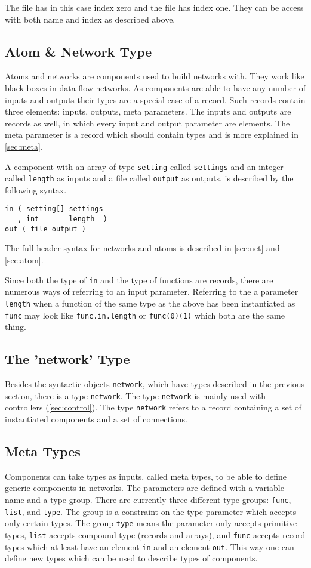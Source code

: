 The file has in this case index zero and the file has index one. They
can be access with both name and index as described above.

\subsection{Atom \& Network Type}\label{sec:atomnet}
Atoms and networks are components used to build networks with. They
work like black boxes in data-flow networks. As components are able to
have any number of inputs and outputs their types are a special case
of a record. Such records contain three elements: inputs, outputs,
meta parameters. The inputs and outputs are records as well, in which
every input and output parameter are elements. The meta parameter is a
record which should contain types and is more explained in
\autoref{sec:meta}.

A component with an array of type \verb#setting# called
\verb#settings# and an integer called \verb#length# as inputs and a
file called \verb#output# as outputs, is described by the following
syntax.

\begin{verbatim}
in ( setting[] settings
   , int       length  )
out ( file output )
\end{verbatim}

The full header syntax for networks and atoms is described in
\autoref{sec:net} and \autoref{sec:atom}.

Since both the type of \verb#in# and the type of functions are
records, there are numerous ways of referring to an input
parameter. Referring to the a parameter \verb#length# when a function
of the same type as the above has been instantiated as \verb#func# may
look like \verb#func.in.length# or \verb#func(0)(1)# which both are
the same thing.

\subsection{The 'network' Type}
Besides the syntactic objects \verb#network#, which have types
described in the previous section, there is a type \verb#network#. The
type \verb#network# is mainly used with controllers
(\autoref{sec:control}). The type \verb#network# refers to a record
containing a set of instantiated components and a set of connections.

\subsection{Meta Types}\label{sec:meta}
Components can take types as inputs, called meta types, to be able to
define generic components in networks. The parameters are defined with
a variable name and a type group. There are currently three different
type groups: \verb#func#, \verb#list#, and \verb#type#. The group is a
constraint on the type parameter which accepts only certain types. The
group \verb#type# means the parameter only accepts primitive types,
\verb#list# accepts compound type (records and arrays), and
\verb#func# accepts record types which at least have an element
\verb#in# and an element \verb#out#. This way one can define new types
which can be used to describe types of components.


